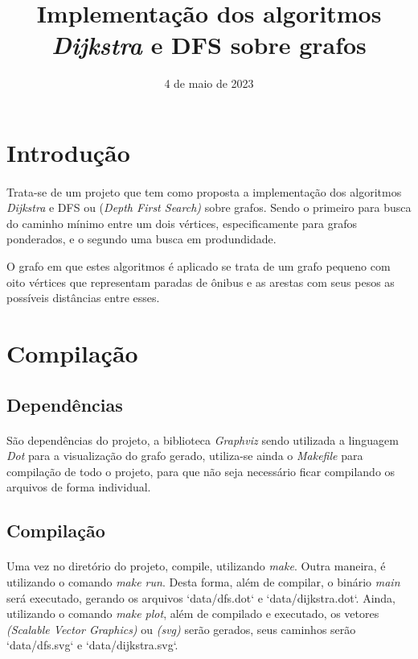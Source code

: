 \documentclass{article}
\title{Implementação dos algoritmos {\it Dijkstra\/} e DFS sobre grafos}
\author{\sc{Paulo Ricardo \& Vinícios Bidin}}
\date{4 de maio de 2023}
\begin{document}
    \maketitle

    \section{Introdução}
        \paragraph{} Trata-se de um projeto que tem como proposta a implementação dos algoritmos {\it Dijkstra} e DFS ou {(\it Depth First Search)} sobre grafos. Sendo o primeiro para busca do caminho mínimo entre um dois vértices, especificamente para grafos ponderados, e o segundo uma busca em produndidade.
		\par O grafo em que estes algoritmos é aplicado se trata de um grafo pequeno com oito vértices que representam paradas de ônibus e as arestas com seus pesos as possíveis distâncias entre esses.

		\section{Compilação}
			\subsection{Dependências}
				\paragraph{} São dependências do projeto, a biblioteca {\it Graphviz} sendo utilizada a linguagem {\it Dot} para a visualização do grafo gerado, utiliza-se ainda o {\it Makefile} para compilação de todo o projeto, para que não seja necessário ficar compilando os arquivos de forma individual.

			\subsection{Compilação}
				\paragraph{} Uma vez no diretório do projeto, compile, utilizando {\it make}.
				Outra maneira, é utilizando o comando {\it make run}. Desta forma, além de compilar, o binário {\it main} será executado, gerando os arquivos `data/dfs.dot` e `data/dijkstra.dot`.
				Ainda, utilizando o comando {\it make plot}, além de compilado e executado, os vetores {\it (Scalable Vector Graphics)} ou {\it (svg)} serão gerados, seus caminhos serão `data/dfs.svg` e `data/dijkstra.svg`.
\end{document}
